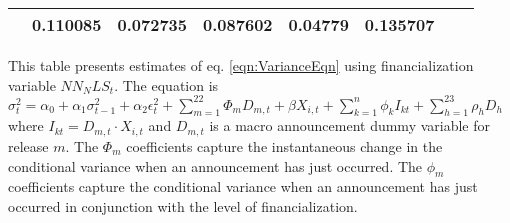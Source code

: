 \begin{sidewaystable}
{\begin{tabular}{@{}lllllllllllll@{}}
                                           & \multicolumn{2}{c}{ 0.110085 }                                                 & \multicolumn{2}{c}{ 0.072735 }                                                 & \multicolumn{2}{c}{ 0.087602 }                                                 & \multicolumn{2}{c}{ 0.04779 }                                                   & \multicolumn{2}{c}{ 0.135707 }                                                 \\ \bottomrule 
\end{tabular}
}
\begin{tablenotes}\item 
        \singlespacing
        \footnotesize
        This table presents estimates of eq. \ref{eqn:VarianceEqn} using financialization variable $NN_NLS_t$. The equation is $\sigma_{t}^2=\alpha_0+\alpha_1 \sigma_{t-1}^2+\alpha_2 \epsilon_t^2 +\sum_{m=1}^{22} \Phi_m D_{m,t}+\beta X_{i,t}+\sum_{k=1}^n \phi_k I_{kt} + \sum_{h=1}^{23} \rho_h D_h$ where $I_{kt}=D_{m,t} \cdot X_{i,t}$ and $D_{m,t}$ is a macro announcement dummy variable for release $m$. The $\Phi_m$ coefficients capture the instantaneous change in the conditional variance when an announcement has just occurred. The $\phi_m$ coefficients capture the conditional variance when an announcement has just occurred in conjunction with the level of financialization.
\end{tablenotes}
\end{sidewaystable}

